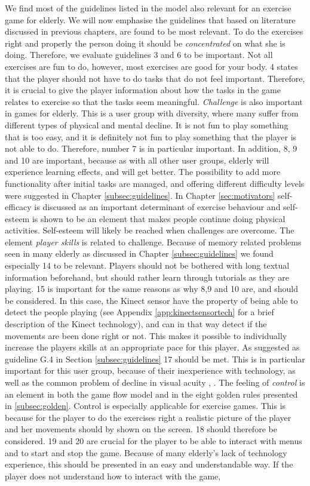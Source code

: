 We find most of the guidelines listed in the model also relevant for an exercise game for elderly. We will now emphasise the guidelines that based on literature discussed in previous chapters, are found to be most relevant. 
To do the exercises right and properly the person doing it should be \emph{concentrated} on what she is doing. Therefore, we evaluate guidelines 3 and 6 to be important. Not all exercises are fun to do, however, most exercises are good for your body. 4 states that the player should not have to do tasks that do not feel important. Therefore, it is crucial to give the player information about how the tasks in the game relates to exercise so that the tasks seem meaningful. \emph{Challenge} is also important in games for elderly. This is a user group with diversity, where many suffer from different types of physical and mental decline. It is not fun to play something that is too easy, and it is definitely not fun to play something that the player is not able to do. Therefore, number 7 is in particular important.  In addition, 8, 9 and 10 are important, because as with all other user groups, elderly will experience learning effects, and will get better. The possibility to add more functionality after initial tasks are managed, and offering different difficulty levels were suggested in Chapter \ref{subsec:guidelines}. In Chapter \ref{sec:motivators} self-efficacy is discussed as an important determinant of exercise behaviour and self-esteem is shown to be an element that makes people continue doing physical activities. Self-esteem will likely be reached when challenges are overcome.  The element \emph{player skills} is related to challenge. Because of memory related problems seen in many elderly as discussed in Chapter \ref{subsec:guidelines} we found especially 14 to be relevant. Players should not be bothered with long textual information beforehand, but should rather learn through tutorials as they are playing. 15 is important for the same reasons as why 8,9 and 10 are, and should be considered. In this case, the Kinect sensor have the property of being able to detect the people playing (see Appendix \ref{app:kinectsensortech} for a brief description of the Kinect technology), and can in that way detect if the movements are been done right or not. This makes it possible to individually increase the players skills at an appropriate pace for this player. As suggested as guideline G.4 in Section \ref{subsec:guidelines} 17 should be met. This is in particular important for this user group, because of their inexperience with technology, as well as the common problem of decline in visual acuity \cite{Billis}, \cite{gregor}. The feeling of \emph{control} is an element in both the game flow model and in the eight golden rules presented in \ref{subsec:golden}. Control is especially applicable for exercise games. This is because for the player to do the exercises right a realistic picture of the player and her movements should by shown on the screen.  18 should therefore be considered. 19 and 20 are crucial for the player to be able to interact with menus and to start and stop the game. Because of many elderly's lack of technology experience, this should be presented in an easy and understandable way. If the player does not understand how to interact with the game, 